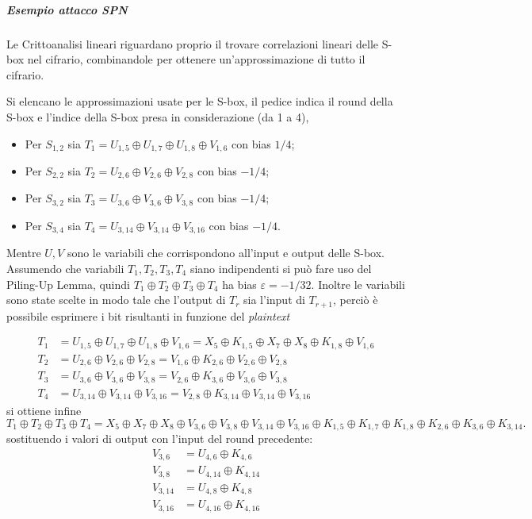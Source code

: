 \subparagraph{Esempio attacco SPN}
Le Crittoanalisi lineari riguardano proprio il trovare correlazioni lineari delle S-box nel cifrario, combinandole per ottenere un'approssimazione di tutto il cifrario. 



Si elencano le approssimazioni usate per le S-box, il pedice indica il round della S-box e l'indice della S-box presa in considerazione (da 1 a 4),
\begin{itemize}
    \item Per $S_{1,2}$ sia  $T_1 = U_{1,5} \oplus U_{1,7} \oplus U_{1,8} \oplus V_{1,6}$ con bias $1/4$;
    \item Per $S_{2,2}$ sia  $T_2 = U_{2,6} \oplus V_{2,6} \oplus V_{2,8}$ con bias $-1/4$;
    \item Per $S_{3,2}$ sia  $T_3 = U_{3,6} \oplus V_{3,6} \oplus V_{3,8}$ con bias $-1/4$;
    \item Per $S_{3,4}$ sia  $T_4 = U_{3,14} \oplus V_{3,14} \oplus V_{3,16}$ con bias $-1/4$.
\end{itemize}
Mentre $U,V$ sono le variabili che corrispondono all'input e output delle S-box. Assumendo che variabili $T_1, T_2, T_3, T_4$ siano indipendenti si può fare uso del Piling-Up Lemma, quindi $T_1\oplus T_2\oplus T_3\oplus T_4$ ha bias $\varepsilon = -1/32$. Inoltre le variabili sono state scelte in modo tale che l'output di $T_r$ sia l'input di $T_{r+1}$, perciò è possibile esprimere i bit risultanti in funzione del \emph{plaintext}

\begin{align*}
    T_1 &= U_{1,5} \oplus U_{1,7} \oplus U_{1,8} \oplus V_{1,6} = X_5 \oplus K_{1,5} \oplus X_7 \oplus X_8 \oplus K_{1,8} \oplus V_{1,6} \\
    T_2 &= U_{2,6} \oplus V_{2,6} \oplus V_{2,8} = V_{1,6} \oplus K_{2,6} \oplus V_{2,6} \oplus V_{2,8}\\
    T_3 &= U_{3,6} \oplus V_{3,6} \oplus V_{3,8} = V_{2,6} \oplus K_{3,6} \oplus V_{3,6} \oplus V_{3,8}\\
    T_4 &= U_{3,14} \oplus V_{3,14} \oplus V_{3,16} = V_{2,8} \oplus K_{3,14} \oplus V_{3,14} \oplus V_{3,16}
\end{align*}
si ottiene infine
\[
    T_1\oplus T_2\oplus T_3\oplus T_4 = X_5 \oplus X_7 \oplus X_8 \oplus V_{3,6} \oplus V_{3,8} \oplus V_{3,14} \oplus V_{3,16} \oplus K_{1,5} \oplus K_{1,7} \oplus K_{1,8} \oplus K_{2,6} \oplus K_{3,6} \oplus K_{3,14}. 
\]
sostituendo i valori di output con l'input del round precedente:
\begin{align*}
    V_{3,6} &= U_{4,6} \oplus K_{4,6}\\
    V_{3,8} &= U_{4,14} \oplus K_{4,14}\\
    V_{3,14} &= U_{4,8}\oplus K_{4,8}\\
    V_{3,16} &= U_{4,16} \oplus K_{4,16}
\end{align*}

